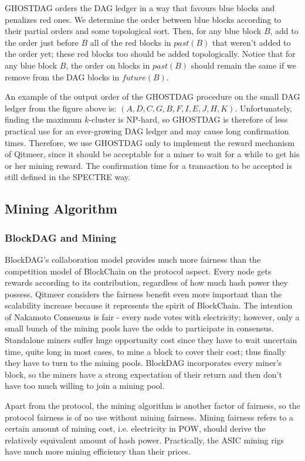 \documentclass[a4paper,11pt]{article}
\begin{document}
GHOSTDAG orders the DAG ledger in a way that favours blue blocks and penalizes
red ones. We determine the order between blue blocks according to their partial
orders and some topological sort. Then, for any blue block $B$, add to the order
just before $B$ all of the red blocks in $past(B)$ that weren’t added to the
order yet; these red blocks too should be added topologically. Notice
that for any blue block $B$, the order on blocks in $past(B)$ should remain the
same if we remove from the DAG blocks in $future(B)$. 

An example of the output order of the GHOSTDAG procedure on the small DAG ledger
from the figure above is: $(A,D,C,G,B,F,I,E,J,H,K)$. Unfortunately, finding the
maximum $k$-cluster is NP-hard, so GHOSTDAG is therefore of less practical use
for an ever-growing DAG ledger and may cause long confirmation times.
Therefore, we use GHOSTDAG only to implement the reward mechanism of Qitmeer, since
it should be acceptable for a miner to wait for a while to get his or her mining
reward. The confirmation time for a transaction to be accepted is still defined
in the SPECTRE way.

\subsection{Mining Algorithm}
\subsubsection{BlockDAG and Mining}
BlockDAG's collaboration model provides much more fairness than the competition model of BlockChain on the protocol aspect. Every node gets rewards according to its contribution, regardless of how much hash power they possess. Qitmeer considers the fairness benefit even more important than the scalability increase because it represents the spirit of BlockChain. The intention of Nakamoto Consensus is fair - every node votes with electricity; however, only a small bunch of the mining pools have the odds to participate in consensus. Standalone miners suffer huge opportunity cost since they have to wait uncertain time, quite long in most cases, to mine a block to cover their cost; thus finally they have to turn to the mining pools. BlockDAG incorporates every miner's block, so the miners have a strong expectation of their return and then don't have too much willing to join a mining pool.

Apart from the protocol, the mining algorithm is another factor of fairness, so the protocol fairness is of no use without mining fairness. Mining fairness refers to a certain amount of mining cost, i.e. electricity in POW, should derive the relatively equivalent amount of hash power. Practically, the ASIC mining rigs have much more mining efficiency than their prices.
\end{document}
